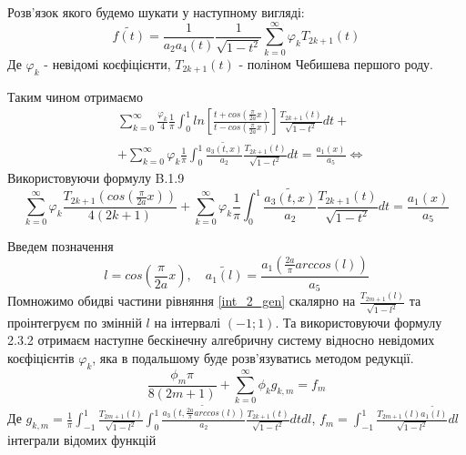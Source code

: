 Розв'язок якого будемо шукати у наступному вигляді:
\begin{equation}
    \widetilde{f(t)} = \frac{1}{a_2 a_4(t)} \frac{1}{\sqrt{1 - t^2}} \sum_{k=0}^{\infty} \varphi_k T_{2k + 1}(t) 
\end{equation}
Де $\varphi_k$ - невідомі коєфіцієнти, $T_{2k + 1}(t)$ - поліном Чебишева першого роду.

Таким чином отримаємо
\begin{align*}
    & \sum_{k=0}^{\infty}  \frac{\varphi_k}{4} \frac{1}{\pi} \int_{0}^{1} ln\left[ \frac{t + cos(\frac{\pi}{2a}x)}{t - cos(\frac{\pi}{2a}x)} \right] \frac{T_{2k + 1}(t)}{\sqrt{1 - t^2}} dt + \\
    & + \sum_{k=0}^{\infty} \varphi_k \frac{1}{\pi} \int_{0}^{1} \frac{\widetilde{a_3(t, x)}}{a_2} \frac{T_{2k + 1}(t)}{\sqrt{1 - t^2}} dt = \frac{a_1(x)}{a_5} \Leftrightarrow
\end{align*}
Використовуючи формулу B.1.9 \cite{ortogonal}
\begin{equation}\label{int_2_gen}
    \sum_{k=0}^{\infty}  \varphi_k \frac{T_{2k + 1}( cos(\frac{\pi}{2a}x) )}{4(2k + 1)} + \sum_{k=0}^{\infty} \varphi_k \frac{1}{\pi} \int_{0}^{1} \frac{\widetilde{a_3(t, x)}}{a_2} \frac{T_{2k + 1}(t)}{\sqrt{1 - t^2}} dt = \frac{a_1(x)}{a_5}
\end{equation}

Введем позначення
\begin{equation*}
    l = cos(\frac{\pi}{2a}x), \quad \widetilde{a_1(l)} = \frac{a_1(\frac{2a}{\pi} arccos(l))}{a_5}
\end{equation*}
Помножимо обидві частини рівняння \eqref{int_2_gen} скалярно на $\frac{T_{2m + 1}(l)}{\sqrt{1 - l^2}}$ та проінтегруєм по змінній $l$ на інтервалі $(-1; 1)$.
Та використовуючи формулу 2.3.2 \cite{ortogonal} отримаєм наступне бескінечну алгебричну систему відносно невідомих коєфіцієнтів $\varphi_k$, яка в подальшому буде розв'язуватись методом редукції.
\begin{equation}\label{int_system_gen}
    \frac{\phi_m \pi}{8(2m + 1)} + \sum_{k=0}^{\infty} \phi_k g_{k, m} = f_m
\end{equation}
Де $g_{k, m} = \frac{1}{\pi} \int_{-1}^{1} \frac{T_{2m + 1}(l)}{\sqrt{1 - l^2}} \int_{0}^{1} \frac{\widetilde{a_3(t, \frac{2a}{\pi} arccos(l) )}}{a_2} \frac{T_{2k + 1}(t)}{\sqrt{1 - t^2}} dt dl$,
$f_m = \int_{-1}^{1} \frac{T_{2m + 1}(l) \widetilde{a_1(l)}}{\sqrt{1 - l^2}} dl$ інтеграли відомих функцій


